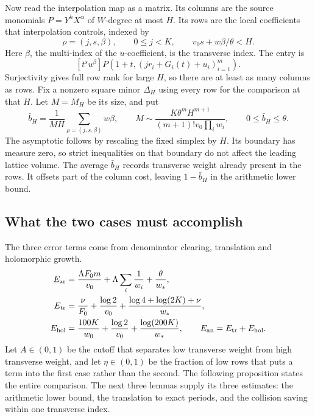 \documentclass[11pt]{article}
\theoremstyle{definition}
\theoremstyle{remark}
\numberwithin{equation}{section}
\begin{document}
Now read the interpolation map as a matrix. Its columns are the source
monomials \(P=Y^hX^\alpha\) of \(W\)-degree at most \(H\). Its rows are
the local coefficients that interpolation controls, indexed by
\begin{equation}\label{eq:rows}
 \rho=(j,s,\beta),\qquad 0\le j<K,\qquad
 v_0s+w\beta/\theta<H.
\end{equation}
Here \(\beta\), the multi-index of the \(u\)-coefficient, is the
transverse index. The entry is
\begin{equation}\label{eq:entry}
 [t^su^\beta]P(1+t,(jr_i+G_i(t)+u_i)_{i=1}^m).
\end{equation}
Surjectivity gives full row rank for large \(H\), so there are at least
as many columns as rows. Fix a nonzero square minor \(\Delta_H\) using
every row for the comparison at that \(H\). Let \(M=M_H\) be its size, and put
\begin{equation}\label{eq:rowcounts}
 \bar b_H=\frac1{MH}\sum_{\rho=(j,s,\beta)}w\beta,
 \qquad
 M\sim\frac{K\theta^mH^{m+1}}{(m+1)!v_0\prod_iw_i},
 \qquad 0\le\bar b_H\le\theta.
\end{equation}
The asymptotic follows by rescaling the fixed simplex by \(H\).
Its boundary has measure zero, so strict inequalities on that boundary
do not affect the leading lattice volume. The average \(\bar b_H\) records
transverse weight already present in the rows. It offsets part of the
column cost, leaving \(1-\bar b_H\) in the arithmetic lower bound.

\subsection{What the two cases must accomplish}
The three error terms come from denominator clearing, translation
and holomorphic growth.
\begin{align}
 E_{\rm ar}&=\frac{\Lambda F_0m}{v_0}
       +\Lambda\sum_i\frac1{w_i}+\frac{\theta}{w_*},\label{eq:Ear}\\
 E_{\rm tr}&=\frac{\nu}{F_0}+\frac{\log2}{v_0}
       +\frac{\log4+\log(2K)+\nu}{w_*},\label{eq:Etr}\\
 E_{\rm hol}&=\frac{100K}{w_0}+\frac{\log2}{v_0}
       +\frac{\log(200K)}{w_*},\qquad
 E_{\rm an}=E_{\rm tr}+E_{\rm hol}.\label{eq:Ehol}
\end{align}
Let \(A\in(0,1)\) be the cutoff that separates low transverse weight
from high transverse weight, and let
\(\eta\in(0,1)\) be the fraction of low rows that puts a term into the
first case rather than the second. The following proposition states the
entire comparison. The next three lemmas supply its three estimates:
the arithmetic lower bound, the translation to exact periods, and the
collision saving within one transverse index.
\end{document}
